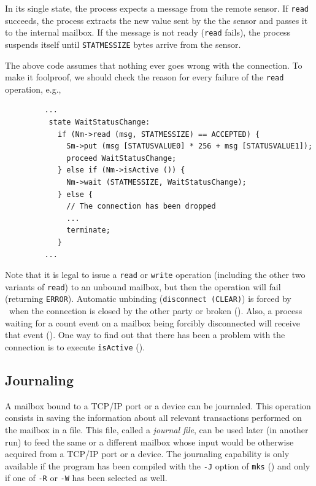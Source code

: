 In its single state, the process expects a message from the remote sensor.
If {\tt read} succeeds, the process extracts the new value sent by the
the sensor and passes it to the internal mailbox.
If the message is not ready ({\tt read} fails),
the process suspends itself until {\tt STATMESSIZE} bytes arrive from
the sensor.

The above code assumes that nothing ever goes wrong with the connection.
To make it foolproof, we should check the reason for every failure of the
{\tt read} operation, e.g.,

\begin{verbatim}
         ...
          state WaitStatusChange:
            if (Nm->read (msg, STATMESSIZE) == ACCEPTED) {
              Sm->put (msg [STATUSVALUE0] * 256 + msg [STATUSVALUE1]);
              proceed WaitStatusChange;
            } else if (Nm->isActive ()) {
              Nm->wait (STATMESSIZE, WaitStatusChange);
            } else {
              // The connection has been dropped
              ...
              terminate;
            }
         ...
\end{verbatim}

\medskip

\noindent
Note that it is legal to issue a {\tt read} or {\tt write} operation
(including the other two variants of {\tt read}) to an unbound mailbox,
but then the operation will fail (returning {\tt ERROR}).
Automatic unbinding ({\tt disconnect~(CLEAR)}) is forced by \smurph\ when
the connection is closed by the other party or broken ().
Also, a process waiting for a count event on a mailbox being forcibly
disconnected will receive that event ().
One way to find out that there has been a problem with the connection is to
execute {\tt isActive} ().

\subsection{Journaling}
\label{rm_mb_ju}

A mailbox bound to a TCP/IP port or a device can be journaled.
This operation consists in saving the information about all relevant
transactions performed on the mailbox in a file.
This file, called a {\em journal file}, can be used later (in another run)
to feed the same or a different mailbox
whose input would be otherwise acquired from a TCP/IP port or a device.
The journaling capability is only available if the program has been
compiled with the {\tt -J} option of {\tt mks} () and
only if one of {\tt -R} or {\tt -W} has been selected as well.

